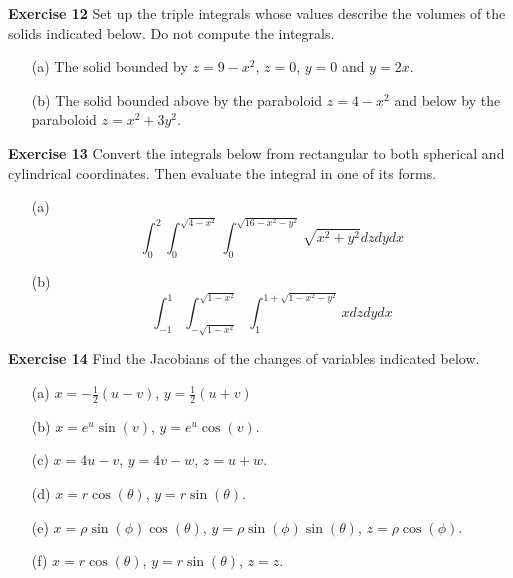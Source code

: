 \documentclass[12pt,oneside]{exam}
\newenvironment{exercise}[1]{\vspace{.1in}\noindent\textbf{Exercise #1 \hspace{.05em}}}{}
\begin{document}
\begin{exercise}{12}
Set up the triple integrals whose values describe the volumes of the solids indicated below. Do not compute the integrals. 
\begin{itemize}
\item[(a)] The solid bounded by $z=9-x^2$, $z=0$, $y=0$ and $y=2x$. 
\item[(b)] The solid bounded above by the paraboloid $z=4-x^2$ and below by the paraboloid $z=x^2+3y^2$. 
\end{itemize}
\end{exercise}

\begin{exercise}{13}
Convert the integrals below from rectangular to both spherical and cylindrical coordinates. Then evaluate the integral in one of its forms. 
\begin{itemize}
\item[(a)]
\begin{equation*}
\int_{0}^{2} \int_{0}^{\sqrt{4-x^2}} \int_{0}^{\sqrt{16-x^2-y^2}} \sqrt{x^2+y^2} dz dy dx
\end{equation*}
\item[(b)]
\begin{equation*}
\int_{-1}^{1} \int_{-\sqrt{1-x^2}}^{\sqrt{1-x^2}} \int_{1}^{1+\sqrt{1-x^2-y^2}} x dz dy dx
\end{equation*}
\end{itemize}
\end{exercise}

\begin{exercise}{14}
Find the Jacobians of the changes of variables indicated below. 
\begin{itemize}
\item[(a)] $x=-\frac{1}{2}(u-v)$, $y=\frac{1}{2}(u+v)$
\item[(b)] $x=e^u\sin(v)$, $y=e^u\cos(v)$. 
\item[(c)] $x=4u-v$, $y=4v-w$, $z=u+w$. 
\item[(d)] $x=r\cos(\theta)$, $y=r\sin(\theta)$.
\item[(e)]  $x=\rho \sin(\phi) \cos(\theta)$, $y=\rho \sin(\phi) \sin(\theta)$, $z=\rho \cos(\phi)$.
\item[(f)] $x=r\cos(\theta)$, $y=r\sin(\theta)$, $z=z$. 
\end{itemize}
\end{exercise}
\end{document}
